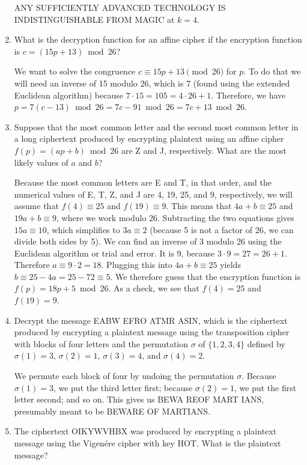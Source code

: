 \documentclass[11pt]{article}
\begin{document}
\begin{enumerate}[label=\textbf{\arabic*.}]
	ANY SUFFICIENTLY ADVANCED TECHNOLOGY IS INDISTINGUISHABLE FROM MAGIC at $k = 4$.
	
	\item What is the decryption function for an affine cipher if the encryption function is $c = (15p + 13) \bmod 26$?
	
	We want to solve the congruence $c \equiv 15p + 13 \pmod{26}$ for $p$. To do that we will need an inverse of 15 modulo 26, which is 7 (found using the extended Euclidean algorithm) because $7 \cdot 15 = 105 = 4 \cdot 26 + 1$. Therefore, we have $p = 7(c - 13) \bmod 26 = 7c - 91 \bmod 26 = 7c + 13 \bmod 26$.
	
	\item Suppose that the most common letter and the second most common letter in a long ciphertext produced by encrypting plaintext using an affine cipher $f(p) = (ap + b) \bmod 26$ are Z and J, respectively. What are the most likely values of $a$ and $b$?
	
	Because the most common letters are E and T, in that order, and the numerical values of E, T, Z, and J are 4, 19, 25, and 9, respectively, we will assume that $f(4) \equiv 25$ and $f(19) \equiv 9$. This means that $4a + b \equiv 25$ and $19a + b \equiv 9$, where we work modulo 26. Subtracting the two equations gives $15a \equiv 10$, which simplifies to $3a \equiv 2$ (because 5 is not a factor of 26, we can divide both sides by 5). We can find an inverse of 3 modulo 26 using the Euclidean algorithm or trial and error. It is 9, because $3 \cdot 9 = 27 = 26 + 1$. Therefore $a \equiv 9 \cdot 2 = 18$. Plugging this into $4a + b \equiv 25$ yields $b \equiv 25 - 4a = 25 - 72 \equiv 5$. We therefore guess that the encryption function is $f(p) = 18p + 5 \bmod 26$. As a check, we see that $f(4) = 25$ and $f(19) = 9$.
	
	\item Decrypt the message EABW EFRO ATMR ASIN, which is the ciphertext produced by encrypting a plaintext message using the transposition cipher with blocks of four letters and the permutation $\sigma$ of $\{1, 2, 3, 4\}$ defined by $\sigma(1) = 3$, $\sigma(2) = 1$, $\sigma(3) = 4$, and $\sigma(4) = 2$.
	
	We permute each block of four by undoing the permutation $\sigma$. Because $\sigma(1) = 3$, we put the third letter first; because $\sigma(2) = 1$, we put the first letter second; and so on. This gives us BEWA REOF MART IANS, presumably meant to be BEWARE OF MARTIANS.
	
	\item The ciphertext OIKYWVHBX was produced by encrypting a plaintext message using the Vigen\'ere cipher with key HOT. What is the plaintext message?
	

\end{enumerate}
\end{document}
